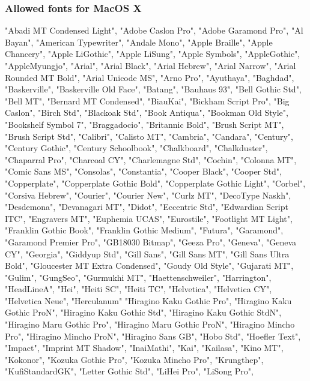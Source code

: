 \subsubsection{Allowed fonts for MacOS X}
"Abadi MT Condensed Light", 
"Adobe Caslon Pro", 
"Adobe Garamond Pro", 
"Al Bayan", 
"American Typewriter",  
"Andale Mono", 
"Apple Braille", 
"Apple Chancery", 
"Apple LiGothic", 
"Apple LiSung", 
"Apple Symbols", 
"AppleGothic", 
"AppleMyungjo", 
"Arial", 
"Arial Black",  
"Arial Hebrew", 
"Arial Narrow", 
"Arial Rounded MT Bold",  
"Arial Unicode MS", 
"Arno Pro", 
"Ayuthaya", 
"Baghdad", 
"Baskerville",  
"Baskerville Old Face",  
"Batang", 
"Bauhaus 93", 
"Bell Gothic Std",  
"Bell MT", 
"Bernard MT Condensed",  
"BiauKai", 
"Bickham Script Pro",  
"Big Caslon", 
"Birch Std", 
"Blackoak Std",  
"Book Antiqua", 
"Bookman Old Style",  
"Bookshelf Symbol 7", 
"Braggadocio", 
"Britannic Bold",  
"Brush Script MT", 
"Brush Script Std", 
"Calibri", 
"Calisto MT",  
"Cambria", 
"Candara", 
"Century", 
"Century Gothic",  
"Century Schoolbook",  
"Chalkboard", 
"Chalkduster", 
"Chaparral Pro", 
"Charcoal CY", 
"Charlemagne Std",  
"Cochin", 
"Colonna MT",  
"Comic Sans MS",  
"Consolas", 
"Constantia", 
"Cooper Black", 
"Cooper Std", 
"Copperplate", 
"Copperplate Gothic Bold",  
"Copperplate Gothic Light", 
"Corbel", 
"Corsiva Hebrew",  
"Courier", 
"Courier New",  
"Curlz MT", 
"DecoType Naskh",  
"Desdemona", 
"Devanagari MT",  
"Didot", 
"Eccentric Std",  
"Edwardian Script ITC",  
"Engravers MT", 
"Euphemia UCAS", 
"Eurostile", 
"Footlight MT Light",  
"Franklin Gothic Book",  
"Franklin Gothic Medium", 
"Futura", 
"Garamond", 
"Garamond Premier Pro",  
"GB18030 Bitmap", 
"Geeza Pro", 
"Geneva", 
"Geneva CY",  
"Georgia", 
"Giddyup Std",  
"Gill Sans", 
"Gill Sans MT", 
"Gill Sans Ultra Bold", 
"Gloucester MT Extra Condensed",  
"Goudy Old Style", 
"Gujarati MT", 
"Gulim", 
"GungSeo", 
"Gurmukhi MT",  
"Haettenschweiler",  
"Harrington", 
"HeadLineA", 
"Hei", 
"Heiti SC",  
"Heiti TC", 
"Helvetica", 
"Helvetica CY",  
"Helvetica Neue",  
"Herculanum"
"Hiragino Kaku Gothic Pro",  
"Hiragino Kaku Gothic ProN",  
"Hiragino Kaku Gothic Std",  
"Hiragino Kaku Gothic StdN",  
"Hiragino Maru Gothic Pro",  
"Hiragino Maru Gothic ProN",  
"Hiragino Mincho Pro",  
"Hiragino Mincho ProN",  
"Hiragino Sans GB",  
"Hobo Std",  
"Hoefler Text",  
"Impact",  
"Imprint MT Shadow",  
"InaiMathi",  
"Kai",  
"Kailasa",  
"Kino MT",  
"Kokonor",  
"Kozuka Gothic Pro",  
"Kozuka Mincho Pro",  
"Krungthep",  
"KufiStandardGK",  
"Letter Gothic Std",  
"LiHei Pro",  
"LiSong Pro",  
